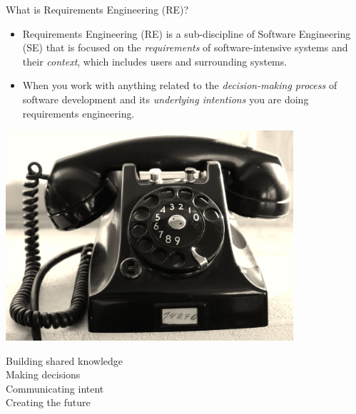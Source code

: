 \documentclass{simpleslides}
\begin{document}
\begin{frame}[fragile]{What is Requirements Engineering (RE)?}
\begin{itemize}
\item  Requirements Engineering (RE) is a sub-discipline of Software Engineering (SE) that is focused on the \textit{requirements} of software-intensive systems and their \textit{context}, which includes users and surrounding systems.
\item When you work with anything related to the \textit{decision-making process} of software development and its \emph{underlying intentions} you are doing requirements engineering.
\end{itemize}
\begin{minipage}[t]{0.4\textwidth}
\vspace{0pt}\hfill\includegraphics[width=0.8\textwidth]{img/phone}
\end{minipage}%
\hspace{2em}\begin{minipage}[t]{0.5\textwidth}
\vspace{1em} 
Building shared knowledge \\ Making decisions \\ Communicating intent \\ Creating the future
\end{minipage}%
  
\end{frame}
\end{document}
